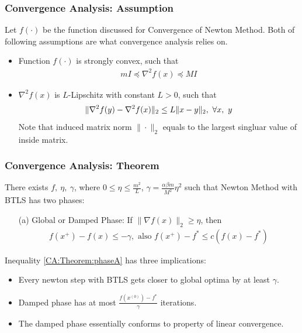 \documentclass{beamer}
\newcommand{\be}{\begin{eqnarray}}
\newcommand{\ee}{\end{eqnarray}}
\begin{document}
\begin{frame}
    \frametitle{Convergence Analysis: Assumption}    
        Let $f(\cdot)$ be the function discussed for Convergence of Newton
        Method. Both of following assumptions are what convergence analysis
        relies on.
        \begin{itemize}
            \item Function $f(\cdot)$ is strongly convex, such that
        \be
        m I \preceq \nabla^2 f(x) \preceq M I
        \ee
    \item $\nabla^2 f(x)$ is $L$-Lipschitz with constant $L > 0$, such that
        \be
        \| \hessian{}{f}{y} - \hessian{}{f}{x} \|_2 \leq L \|x-y\|_2,\ 
        \forall x,\ y
        \ee
        Note that induced matrix norm $\| \cdot \|_2$ equals to the largest
        singluar value of inside matrix.
        \end{itemize}
\end{frame}

\begin{frame}
    \frametitle{Convergence Analysis: Theorem}    
    \begin{theorem}[Part I]
        There exists $f,\ \eta,\ \gamma$, where $ 0 \leq \eta \leq \frac{m^2}{L}$,
        $\gamma = \frac{\alpha \beta m}{M^2}\eta^2$
        such that Newton Method with BTLS has two phases: 
        \begin{itemize}
            \item[(a)] Global or Damped Phase: If $\|\nabla f(x)\|_2 \geq \eta$, then 
                \be
                f(x^{+}) - f(x) \leq -\gamma, \text{ also } 
                f(x^{+}) - f^* \leq c(f(x)-f^*) \label{CA:Theorem:phaseA}
                \ee
        \end{itemize}
    \end{theorem}
        Inequality \eqref{CA:Theorem:phaseA} has three implications: 
        \begin{itemize}
            \item Every newton step with BTLS gets closer to global optima by
                at least $\gamma$.
            \item Damped phase has at most $\frac{f(x^{(0)}) -
                    f^{*}}{\gamma}$ iterations.
            \item The damped phase essentially conforms to property of linear convergence.
        \end{itemize}
\end{frame}
\end{document}
